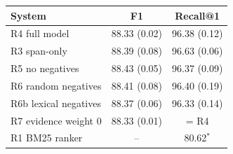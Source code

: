 \begin{tabular}{lcc}
\hline
System & F1 & Recall@1 \\
\hline
R4 full model & 88.33 (0.02) & 96.38 (0.12) \\
R3 span-only & 88.39 (0.08) & 96.63 (0.06) \\
R5 no negatives & 88.43 (0.05) & 96.37 (0.09) \\
R6 random negatives & 88.41 (0.08) & 96.40 (0.19) \\
R6b lexical negatives & 88.37 (0.06) & 96.33 (0.14) \\
R7 evidence weight 0 & 88.33 (0.01) & = R4 \\
R1 BM25 ranker & -- & 80.62$^{*}$ \\
\hline
\end{tabular}
